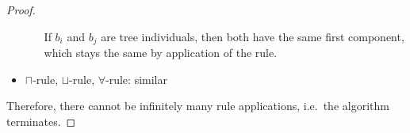 \begin{proof}
\begin{itemize}
\begin{itemize}
\begin{figure}[H]
						\centering
					\end{figure}
					If $b_i$ and $b_j$ are tree individuals, then both have the same first component,
					which stays the same by application of the rule.
			\end{itemize}
		\item $\sqcap$-rule, $\sqcup$-rule, $\forall$-rule: similar
	\end{itemize}
	Therefore, there cannot be infinitely many rule applications, i.e.\ the algorithm terminates.
\end{proof}

